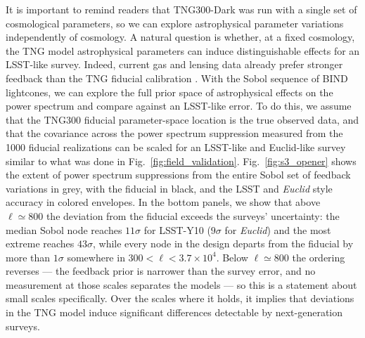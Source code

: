 \documentclass[linenumbers,trackchanges, twocolumn]{aastex701}
\begin{document}
It is important to remind readers that TNG300-Dark was run with a single set of cosmological parameters, so we can explore astrophysical parameter variations independently of cosmology. A natural question is whether, at a fixed cosmology, the TNG model astrophysical parameters can induce distinguishable effects for an LSST-like survey. Indeed, current gas and lensing data already prefer stronger feedback than the TNG fiducial calibration \citep{Bigwood-2024, Siegel-2025, Bigwood-2025b}. With the Sobol sequence of \textsc{BIND} lightcones, we can explore the full prior space of astrophysical effects on the power spectrum and compare against an LSST-like error. To do this, we assume that the TNG300 fiducial parameter-space location is the true observed data, and that the covariance across the power spectrum suppression measured from the 1000 fiducial realizations can be scaled for an LSST-like and Euclid-like survey similar to what was done in Fig.~\ref{fig:field_validation}. Fig.~\ref{fig:s3_opener} shows the extent of power spectrum suppressions from the entire Sobol set of feedback variations in grey, with the fiducial in black, and the LSST and \textit{Euclid} style accuracy in colored envelopes. In the bottom panels, we show that above $\ell\simeq800$ the deviation from the fiducial exceeds the surveys' uncertainty: the median Sobol node reaches $11\sigma$ for LSST-Y10 ($9\sigma$ for \textit{Euclid}) and the most extreme reaches $43\sigma$, while every node in the design departs from the fiducial by more than $1\sigma$ somewhere in $300<\ell<3.7\times10^4$. Below $\ell\simeq800$ the ordering reverses --- the feedback prior is narrower than the survey error, and no measurement at those scales separates the models --- so this is a statement about small scales specifically. Over the scales where it holds, it implies that deviations in the TNG model induce significant differences detectable by next-generation surveys.
\end{document}
